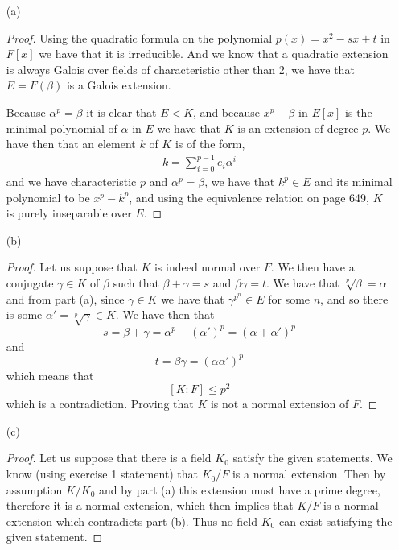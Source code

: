 \documentclass[11pt]{article}
\renewcommand{\leq}{\leqslant}
\begin{document}
\begin{itemize}
    \item[(a)]
    \begin{proof}
        Using the quadratic formula on the polynomial $p(x) = x^{2}-sx + t$ in $F[x]$ we have that it is irreducible. And we know that a quadratic extension is always Galois over fields of characteristic other than 2, we have that $E = F(\beta)$ is a Galois extension. 

        Because $\alpha^{p} = \beta$ it is clear that $E < K$, and because $x^{p} - \beta$ in $E[x]$ is the minimal polynomial of $\alpha$ in $E$ we have that $K$ is an extension of degree $p$. We have then that an element $k$ of $K$ is of the form,
        \begin{align*}
            k = \sum_{i = 0}^{p-1}e_i\alpha^{i}
        \end{align*}
        and we have characteristic $p$ and $\alpha^{p} = \beta$, we have that $k^{p} \in E$ and its minimal polynomial to be $x^{p} -k^{p}$, and using the equivalence relation on page 649, $K$ is purely inseparable over $E$. 
    \end{proof} 
    \item[(b)]
    \begin{proof}
        Let us suppose that $K$ is indeed normal over $F$. We then have a conjugate $\gamma\in K$ of $\beta$ such that $\beta + \gamma = s$ and $\beta\gamma = t$. We have that $\sqrt[p]{\beta} = \alpha$ and from part (a), since $\gamma \in K$ we have that $\gamma^{p^{n}}\in E$ for some $n$, and so there is some $\alpha' = \sqrt[p]{\gamma}\in K$. We have then that 
        \[s = \beta + \gamma = \alpha^{p} + (\alpha')^{p} = (\alpha + \alpha')^{p}\]
        and 
        \[t = \beta \gamma = (\alpha\alpha')^{p}\]
        which means that
        \[[K:F] \leq p^{2}\]
        which is a contradiction. Proving that $K$ is not a normal extension of $F$. 
    \end{proof} 
    \item[(c)]  
    \begin{proof}
        Let us suppose that there is a field $K_0$ satisfy the given statements. We know (using exercise 1 statement) that $K_0/F$ is a normal extension. Then by assumption $K/K_0$ and by part (a) this extension must have a prime degree, therefore it is a normal extension, which then implies that $K/F$ is a normal extension which contradicts part (b). Thus no field $K_0$ can exist satisfying the given statement. 
    \end{proof} 
\end{itemize}
\end{document}
